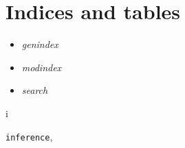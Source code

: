 \documentclass[letterpaper,10pt,english]{sphinxmanual}
\begin{document}
\chapter{Indices and tables}
\label{index:pylint-brain}\label{index:indices-and-tables}\begin{itemize}
\item {} 
\emph{genindex}

\item {} 
\emph{modindex}

\item {} 
\emph{search}

\end{itemize}


\renewcommand{\indexname}{Python Module Index}
\begin{theindex}
\def\bigletter#1{{\Large\sffamily#1}\nopagebreak\vspace{1mm}}
\bigletter{i}
\item {\texttt{inference}}, \pageref{inference:module-inference}
\end{theindex}

\renewcommand{\indexname}{Index}
\printindex
\end{document}

